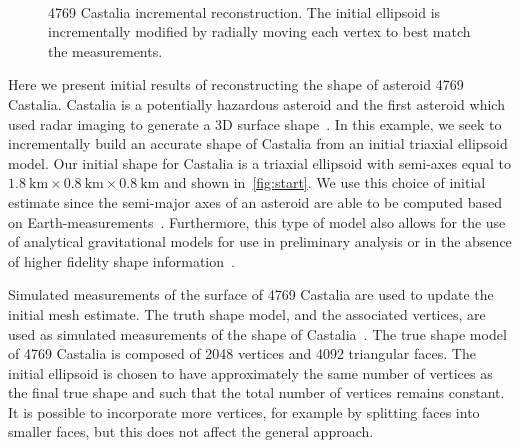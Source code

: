 \documentclass[letterpaper, paper,11pt]{AAS}		%
\begin{document}
\begin{figure}[h]
    ~
    \caption{4769 Castalia incremental reconstruction. The initial ellipsoid is incrementally modified by radially moving each vertex to best match the measurements.~\label{fig:reconstruction}}
\end{figure}
Here we present initial results of reconstructing the shape of asteroid 4769 Castalia.
Castalia is a potentially  hazardous asteroid and the first asteroid which used radar imaging to generate a 3D surface shape~\cite{hudson1994}.
In this example, we seek to incrementally build an accurate shape of Castalia from an initial triaxial ellipsoid model.
Our initial shape for Castalia is a triaxial ellipsoid with semi-axes equal to \( \SI{1.8}{\kilo\meter} \times \SI{0.8}{\kilo\meter} \times \SI{0.8}{\kilo\meter}\) and shown in~\cref{fig:start}.
We use this choice of initial estimate since the semi-major axes of an asteroid are able to be computed based on Earth-measurements~\cite{busch2011}.
Furthermore, this type of model also allows for the use of analytical gravitational models for use in preliminary analysis or in the absence of higher fidelity shape information~\cite{scheeres1994}.

Simulated measurements of the surface of 4769 Castalia are used to update the initial mesh estimate.
The truth shape model, and the associated vertices, are used as simulated measurements of the shape of Castalia~\cite{neese2004}.
The true shape model of 4769 Castalia is composed of \num{2048} vertices and \num{4092} triangular faces.
The initial ellipsoid is chosen to have approximately the same number of vertices as the final true shape and such that the total number of vertices remains constant.
It is possible to incorporate more vertices, for example by splitting faces into smaller faces, but this does not affect the general approach.
\end{document}
